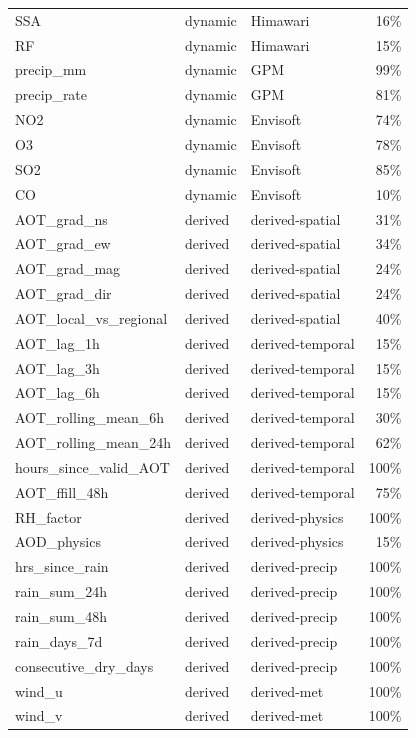 \documentclass[../DoAn.tex]{subfiles}
\begin{document}
{\begin{longtable}{p{4cm}lp{3cm}r}
  SSA & dynamic & Himawari & 16\% \\
  RF & dynamic & Himawari & 15\% \\
  precip\_mm & dynamic & GPM & 99\% \\
  precip\_rate & dynamic & GPM & 81\% \\
  NO2 & dynamic & Envisoft & 74\% \\
  O3 & dynamic & Envisoft & 78\% \\
  SO2 & dynamic & Envisoft & 85\% \\
  CO & dynamic & Envisoft & 10\% \\
  AOT\_grad\_ns & derived & derived-spatial & 31\% \\
  AOT\_grad\_ew & derived & derived-spatial & 34\% \\
  AOT\_grad\_mag & derived & derived-spatial & 24\% \\
  AOT\_grad\_dir & derived & derived-spatial & 24\% \\
  AOT\_local\_vs\_regional & derived & derived-spatial & 40\% \\
  AOT\_lag\_1h & derived & derived-temporal & 15\% \\
  AOT\_lag\_3h & derived & derived-temporal & 15\% \\
  AOT\_lag\_6h & derived & derived-temporal & 15\% \\
  AOT\_rolling\_mean\_6h & derived & derived-temporal & 30\% \\
  AOT\_rolling\_mean\_24h & derived & derived-temporal & 62\% \\
  hours\_since\_valid\_AOT & derived & derived-temporal & 100\% \\
  AOT\_ffill\_48h & derived & derived-temporal & 75\% \\
  RH\_factor & derived & derived-physics & 100\% \\
  AOD\_physics & derived & derived-physics & 15\% \\
  hrs\_since\_rain & derived & derived-precip & 100\% \\
  rain\_sum\_24h & derived & derived-precip & 100\% \\
  rain\_sum\_48h & derived & derived-precip & 100\% \\
  rain\_days\_7d & derived & derived-precip & 100\% \\
  consecutive\_dry\_days & derived & derived-precip & 100\% \\
  wind\_u & derived & derived-met & 100\% \\
  wind\_v & derived & derived-met & 100\% \\

\end{longtable}}
\end{document}
